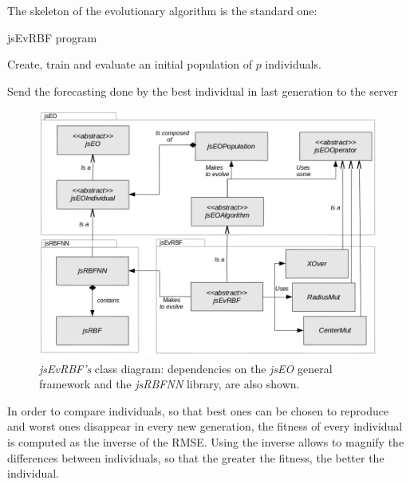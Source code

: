 \documentclass{article}
\begin{document}
The skeleton of the evolutionary algorithm is the standard one:

\begin{algorithm}
\caption{jsEvRBF program}
\begin{algorithmic}
\STATE Create, train and evaluate an initial population of $p$ individuals.

\ENDFOR
\STATE Send the forecasting done by the best individual in last generation to the server
\end{algorithmic}
\end{algorithm}

\begin{figure}[!ht]
\includegraphics[width=120mm]{class-diagram.jpg}
\caption{{\em jsEvRBF's} class diagram: dependencies on the \emph{jsEO} general framework and the \emph{jsRBFNN} library, are also shown.}
\label{fig:class_diagram}
\end{figure}


In order to compare individuals, so that best ones can be chosen to reproduce and worst ones disappear in every new generation, the fitness of every individual is computed as the inverse of the RMSE. Using the inverse allows to magnify the differences between individuals, so that the greater the fitness, the better the individual.
\end{document}

